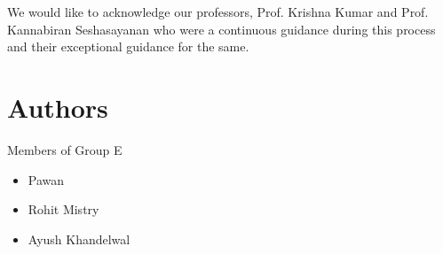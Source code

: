\documentclass{article}
\begin{document}
	We would like to acknowledge our professors, Prof. Krishna Kumar and Prof. Kannabiran Seshasayanan who were a continuous guidance during this process and their exceptional guidance for the same.
	\section*{Authors}
 		Members of Group E
		\begin{itemize}
		\item Pawan 
		\item Rohit Mistry
		\item Ayush Khandelwal
		\end{itemize}
\end{document}
